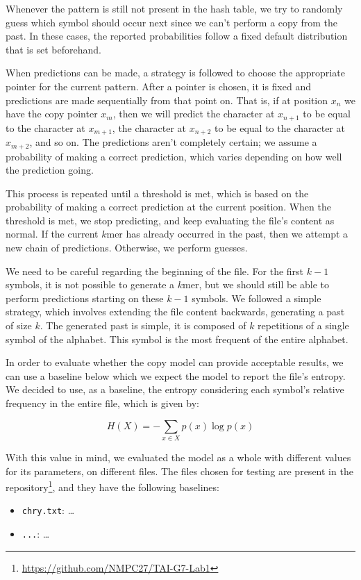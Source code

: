 \documentclass{article}
\begin{document}
Whenever the pattern is still not present in the hash table, we try to randomly guess which symbol should occur next since we can't perform a copy from the past.
In these cases, the reported probabilities follow a fixed default distribution that is set beforehand.

When predictions can be made, a strategy is followed to choose the appropriate pointer for the current pattern.
After a pointer is chosen, it is fixed and predictions are made sequentially from that point on.
That is, if at position $x_n$ we have the copy pointer $x_m$, then we will predict the character at $x_{n+1}$ to be equal to the character at $x_{m+1}$, the character at $x_{n+2}$ to be equal to the character at $x_{m+2}$, and so on.
The predictions aren't completely certain; we assume a probability of making a correct prediction, which varies depending on how well the prediction going.

This process is repeated until a threshold is met, which is based on the probability of making a correct prediction at the current position.
When the threshold is met, we stop predicting, and keep evaluating the file's content as normal.
If the current $k$mer has already occurred in the past, then we attempt a new chain of predictions.
Otherwise, we perform guesses.

We need to be careful regarding the beginning of the file.
For the first $k-1$ symbols, it is not possible to generate a $k$mer, but we should still be able to perform predictions starting on these $k-1$ symbols.
We followed a simple strategy, which involves extending the file content backwards, generating a past of size $k$.
The generated past is simple, it is composed of $k$ repetitions of a single symbol of the alphabet.
This symbol is the most frequent of the entire alphabet.

In order to evaluate whether the copy model can provide acceptable results, we can use a baseline below which we expect the model to report the file's entropy.
We decided to use, as a baseline, the entropy considering each symbol's relative frequency in the entire file, which is given by:

$$
H(X) = - \sum_{x \in X}{p(x) \log{p(x)}}
$$

With this value in mind, we evaluated the model as a whole with different values for its parameters, on different files.
The files chosen for testing are present in the repository\footnote{\url{https://github.com/NMPC27/TAI-G7-Lab1}}, and they have the following baselines:
\begin{itemize}
    \item \verb|chry.txt|: \dots
    \item \verb|...|: \dots
\end{itemize}
\end{document}
